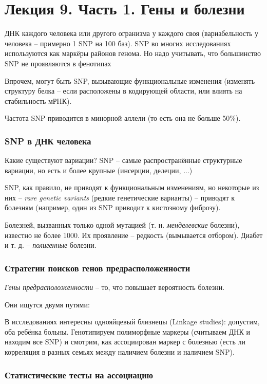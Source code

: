 \documentclass[main.tex]{subfiles}
\begin{document}
\section{Лекция 9. Часть 1. Гены и болезни}

ДНК каждого человека или другого огранизма у каждого своя (вариабельность у человека -- примерно 1 SNP на 100 баз).
SNP во многих исследованиях используются как маркёры районов генома.
Но надо учитывать, что большинство SNP не проявляются в фенотипах

Впрочем, могут быть SNP, вызывающие функциональные изменения (изменять структуру белка -- если расположены в кодирующей области, или влиять на стабильность мРНК).

Частота SNP приводится в минорной аллели (то есть она не больше 50\%).

\subsubsection{SNP в ДНК человека}

Какие существуют вариации?
SNP -- самые распространённые структурные вариации, но есть и более крупные (инсерции, делеции, ...)

SNP, как правило, не приводят к функциональным изменениям, но некоторые из них -- \emph{rare genetic variants} (редкие генетические варианты) -- приводят к болезням (например, один из SNP приводит к кистозному фиброзу).

Болезней, вызванных только одной мутацией (т. н. \emph{менделевские} болезни), известно не более 1000.
Их проявление -- редкость (вымывается отбором).
Диабет и т. д. -- \emph{полигенные} болезни.

\subsubsection{Стратегии поисков генов предрасположенности}

\emph{Гены предрасположенности} -- то, что повышает вероятность болезни.

Они ищутся двумя путями: %

В исследованиях интересны однояйцевый близнецы (Linkage studies):
допустим, оба ребёнка больны.
Генотипируем полиморфные маркеры (считываем ДНК и находим все SNP) и смотрим, как ассоциирован маркер с болезнью (есть ли корреляция в разных семьях между наличием болезни и наличием SNP). %

\subsubsection{Статистические тесты на ассоциацию}
\end{document}
